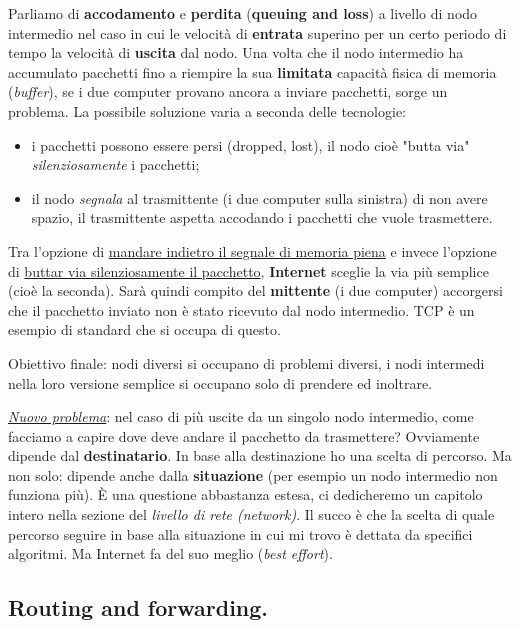 \documentclass[10pt, a4paper, openany]{book}
\begin{document}
\noindent Parliamo di \textbf{accodamento} e \textbf{perdita} (\textbf{queuing and loss}) a livello di nodo intermedio nel caso in cui le velocità di \textbf{entrata} superino per un certo periodo di tempo la velocità di \textbf{uscita} dal nodo. Una volta che il nodo intermedio ha accumulato pacchetti fino a riempire la sua \textbf{limitata} capacità fisica di memoria (\textit{buffer}), se i due computer provano ancora a inviare pacchetti, sorge un problema. La possibile soluzione varia a seconda delle tecnologie:
\begin{itemize}
    \item i pacchetti possono essere persi (dropped, lost), il nodo cioè "butta via" \textit{silenziosamente} i pacchetti;
    \item il nodo \textit{segnala} al trasmittente (i due computer sulla sinistra) di non avere spazio, il trasmittente aspetta accodando i pacchetti che vuole trasmettere.
\end{itemize}

\noindent Tra l'opzione di \underline{mandare indietro il segnale di memoria piena} e invece l'opzione di \underline{buttar via silenziosamente il pacchetto}, \textbf{Internet} sceglie la via più semplice (cioè la seconda). Sarà quindi compito del \textbf{mittente} (i due computer) accorgersi che il pacchetto inviato non è stato ricevuto dal nodo intermedio. TCP è un esempio di standard che si occupa di questo.

\noindent Obiettivo finale: nodi diversi si occupano di problemi diversi, i nodi intermedi nella loro versione semplice si occupano solo di prendere ed inoltrare.

\vspace{0.5cm}

\noindent \underline{\textit{Nuovo problema}}: nel caso di più uscite da un singolo nodo intermedio, come facciamo a capire dove deve andare il pacchetto da trasmettere? Ovviamente dipende dal \textbf{destinatario}. In base alla destinazione ho una scelta di percorso. Ma non solo: dipende anche dalla \textbf{situazione} (per esempio un nodo intermedio non funziona più). È una questione abbastanza estesa, ci dedicheremo un capitolo intero nella sezione del \textit{livello di rete (network)}. Il succo è che la scelta di quale percorso seguire in base alla situazione in cui mi trovo è dettata da specifici algoritmi. Ma Internet fa del suo meglio (\textit{best effort}).

\subsection{Routing and forwarding.}
\end{document}
